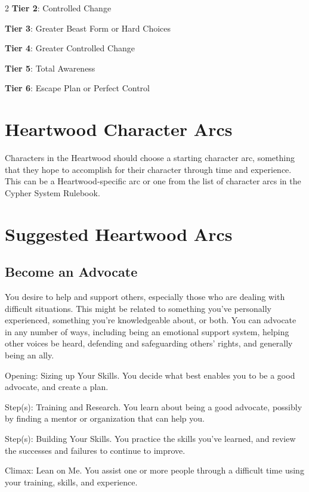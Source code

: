 \begin{multicols}{2}
\textbf{Tier 2}: Controlled Change

\textbf{Tier 3}: Greater Beast Form or Hard Choices

\textbf{Tier 4}: Greater Controlled Change

\textbf{Tier 5}: Total Awareness

\textbf{Tier 6}: Escape Plan or Perfect Control

\section{Heartwood Character Arcs}

Characters in the Heartwood should choose a starting character arc, something that they hope to accomplish for their character through time and experience. This can be a Heartwood-specific arc or one from the list of character arcs in the Cypher System Rulebook.

\section{Suggested Heartwood Arcs}

\subsection{Become an Advocate}

You desire to help and support others, especially those who are dealing with difficult situations. This might be related to something you’ve personally experienced, something you’re knowledgeable about, or both. You can advocate in any number of ways, including being an emotional support
system, helping other voices be heard, defending and safeguarding others’ rights, and generally being an ally.

Opening: Sizing up Your Skills. You decide what best enables you to be a good advocate, and create a plan.

Step(s): Training and Research. You learn about being a good advocate, possibly by finding a mentor or organization that can help you.

Step(s): Building Your Skills. You practice the skills you’ve learned, and review the successes and failures to continue to improve.

Climax: Lean on Me. You assist one or more people through a difficult time using your training, skills, and experience.


\end{multicols}
